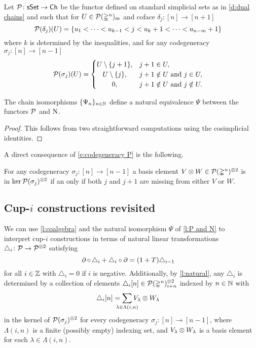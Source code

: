 \begin{definition}
	Let $\mathcal{P} \colon \mathsf{sSet} \to \mathsf{Ch}$ be the functor defined on standard simplicial sets as in \cref{d:dual chains} and such that for $U \in \mathcal{P}(\mathbb{\Delta}^n)_m$ and coface $\delta_j \colon [n] \to [n+1]$
	\[
	\mathcal{P}(\delta_j)(U) = \{ u_1 < \dots < u_{k-1} < j < u_k+1 < \dots < u_{n-m}+1 \}
	\]
	where $k$ is determined by the inequalities, and for any codegeneracy $\sigma_j \colon [n] \to [n-1]$
	\begin{equation}\label{e:codegeneracy P}
	\cP(\sigma_j)(U) = \begin{cases}
	U \setminus \{j+1\}, & j+1 \in U, \\
	\hfil U \setminus \{j\}, & j+1 \notin U \text{ and } j \in U, \\
	\hfil 0, & j+1 \notin U \text{ and } j \notin U.
	\end{cases}
	\end{equation}
\end{definition}

\begin{lemma}\label{l:P and N}
	The chain isomorphisms $\{\Psi_n\}_{n \in \mathbb{N}}$ define a natural equivalence $\Psi$ between the functors $\mathcal{P}$ and $\operatorname{N}$.
\end{lemma}

\begin{proof}
	This follows from two straightforward computations using the cosimplicial identities.
\end{proof}

A direct consequence of \cref{e:codegeneracy P} is the following.

\begin{lemma}\label{l:kernel of sxs}
	For any codegeneracy $\sigma_j \colon [n] \to [n-1]$ a basis element $V \otimes W \in \mathcal{P}(\mathbb{\Delta}^n)^{\otimes 2}$ is in $\ker \mathcal{P}(\sigma_j)^{\otimes 2}$ if an only if both $j$ and $j+1$ are missing from either $V$ or $W$.
\end{lemma}

\subsection{Cup-$i$ constructions revisited}

We can use \cref{l:coalgebra} and the natural isomorphism $\Psi$ of \cref{l:P and N} to interpret \mbox{cup-$i$} constructions in terms of natural linear transformations $\triangle_i \colon \mathcal{P} \to \mathcal{P}^{\otimes 2}$ satisfying
\[
\operatorname{\partial} \circ \, \triangle_i + \triangle_i \circ \operatorname{\partial} =
(1+T) \triangle_{i-1}
\]
for all $i \in \mathbb{Z}$ with $\triangle_{i} = 0$ if $i$ is negative.
Additionally, by \cref{l:natural}, any $\triangle_i$ is determined by a collection of elements $\triangle_i [n] \in \mathcal{P}(\mathbb{\Delta}^n)^{\otimes 2}_{i+n} $ indexed by $n \in \mathbb{N}$ with
\[
\triangle_i [n] =
\sum_{\mathclap{\lambda \in \Lambda(i,n)}} V_\lambda \ot W_\lambda
\]
in the kernel of $\mathcal{P}(\sigma_j)^{\otimes 2}$ for every codegeneracy $\sigma_j \colon [n] \to [n-1]$,
where $\Lambda(i,n)$ is a finite (possibly empty) indexing set, and $V_\lambda \otimes W_\lambda$ is a basis element for each $\lambda \in \Lambda(i,n)$.

